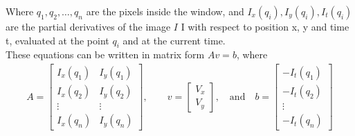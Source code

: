 Where $q_{1},q_{2},\dots ,q_{n}$ are the pixels inside the window, and $I_{x}(q_{i}),I_{y}(q_{i}),I_{t}(q_{i})$ are the partial derivatives of the image $I$ I with respect to position x, y and time t, evaluated at the point $q_{i}$ and at the current time.\\
These equations can be written in matrix form $Av=b$, where
\begin{align}
A={\begin{bmatrix}I_{x}(q_{1})&I_{y}(q_{1})\\[10pt]I_{x}(q_{2})&I_{y}(q_{2})\\[10pt]\vdots &\vdots \\[10pt]I_{x}(q_{n})&I_{y}(q_{n})\end{bmatrix}},\quad \quad v={\begin{bmatrix}V_{x}\\[10pt]V_{y}\end{bmatrix}},\quad {\mbox{and}}\quad b={\begin{bmatrix}-I_{t}(q_{1})\\[10pt]-I_{t}(q_{2})\\[10pt]\vdots \\[10pt]-I_{t}(q_{n})\end{bmatrix}}
\end{align}

